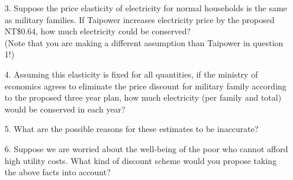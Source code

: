 \documentclass[12pt, xcolor=dvipsnames]{beamer}
\begin{document}
\begin{frame}
\begin{enumerate}\itemsep-0.5ex
\small
\item[3.] Suppose the price elasticity of electricity for normal households is the same as military families. If Taipower increases electricity price by the proposed NT\$0.64, how much electricity could be conserved? \\
(Note that you are making a different assumption than Taipower in question 1!)
\item[4.] Assuming this elasticity is fixed for all quantities, if the ministry of economics agrees to eliminate the price discount for military family according to the proposed three year plan, how much electricity (per family and total) would be conserved in each year?
\item[5.] What are the possible reasons for these estimates to be inaccurate?
\item[6.] Suppose we are worried about the well-being of the poor who cannot afford high utility costs. What kind of discount scheme would you propose taking the above facts into account? 
\end{enumerate}
\end{frame}
\end{document}
